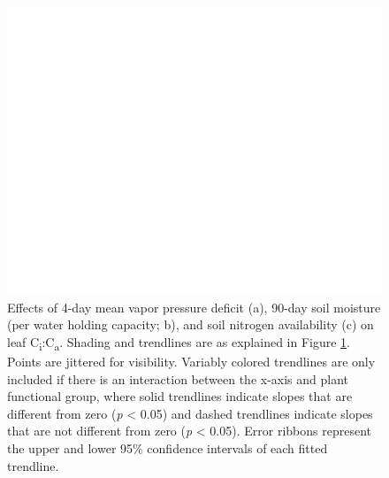 \newpage
\begin{figure}
    \centering
    \includegraphics[scale = 0.07]{ch4_TXeco/figs/TXeco_fig3_chi.png}
    \caption[Effects of 4-day mean vapor pressure deficit, 2-day soil moisture (per water holding capacity), and soil nitrogen availability on leaf C\textsubscript{i}:C\textsubscript{a}. ]{Effects of 4-day mean vapor pressure deficit (a), 90-day soil moisture (per water holding capacity; b), and soil nitrogen availability (c) on leaf C\textsubscript{i}:C\textsubscript{a}. Shading and trendlines are as explained in Figure \ref{fig:figure4.3}. Points are jittered for visibility. Variably colored trendlines are only included if there is an interaction between the x-axis and plant functional group, where solid trendlines indicate slopes that are different from zero (\textit{p} < 0.05) and dashed trendlines indicate slopes that are not different from zero (\textit{p} < 0.05). Error ribbons represent the upper and lower 95\% confidence intervals of each fitted trendline.}
    \label{fig:figure4.3}
\end{figure}
\clearpage

